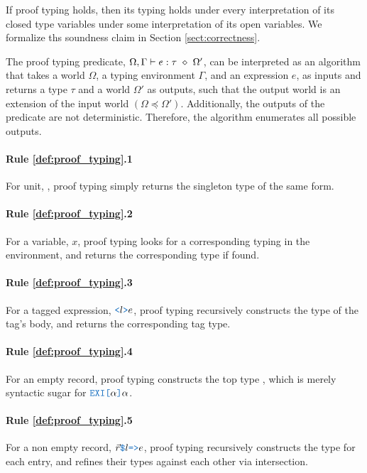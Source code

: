 \documentclass[acmsmall]{acmart}
\theoremstyle{definition}
\begin{document}
If proof typing holds, then its typing holds under every interpretation of its closed type variables
under some interpretation of its open variables.
We formalize ths soundness claim in Section \ref{sect:correctness}. 

The proof typing predicate, $\Omega, \Gamma \vdash e : \tau \ \diamond\  \Omega'$, can 
be interpreted as an algorithm that takes a world $\Omega$, a typing environment $\Gamma$, and an expression $e$,
as inputs and returns a type $\tau$ and a world $\Omega'$ as outputs,
such that the output world is an extension of the input world $(\Omega \preceq \Omega')$.
Additionally, the outputs of the predicate are not deterministic. Therefore, the algorithm
enumerates all possible outputs.

\paragraph{Rule \ref{def:proof_typing}.1}
For unit, , proof typing simply returns the singleton type of the same
form. 

\paragraph{Rule \ref{def:proof_typing}.2}
For a variable, $x$, proof typing looks
for a corresponding typing in the environment, and returns the 
corresponding type if found.

\paragraph{Rule \ref{def:proof_typing}.3}
For a tagged expression, $\obj{<}l\obj{>}e$, proof typing recursively 
constructs the type of the tag's body,
and returns the corresponding tag type.

\paragraph{Rule \ref{def:proof_typing}.4}
For an empty record, proof typing constructs the top type ,
which is merely syntactic sugar for $\obj{EXI[}\alpha\obj{]}\alpha$.

\paragraph{Rule \ref{def:proof_typing}.5}
For a non empty record, $\vec{r}\obj{\$}l\obj{=>}e$, proof typing 
recursively constructs the type for each entry, and
refines their types against each other via intersection.
\end{document}
